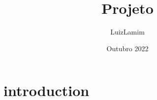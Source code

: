 \documentclass[a4paper,12pt]{article}
\title{Projeto}
\author{LuizLamim}
\date{Outubro 2022}
\begin{document}
\maketitle

\section{introduction}
\end{document}
